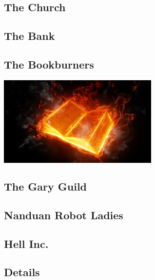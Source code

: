 \smallskip

\subsection*{The Church} 

\smallskip

\subsection*{The Bank} 

\smallskip

\subsection*{The Bookburners} 

\begin{center}
\includegraphics[width=80mm]{./content/img/bookBurner.jpg}
\begin{figure}[h]
\end{figure}
\end{center}


\smallskip

\subsection*{The Gary Guild} 

\smallskip

\subsection*{Nanduan Robot Ladies} 

\smallskip

\subsection*{Hell Inc.} 

\smallskip

\subsection*{Details} 

